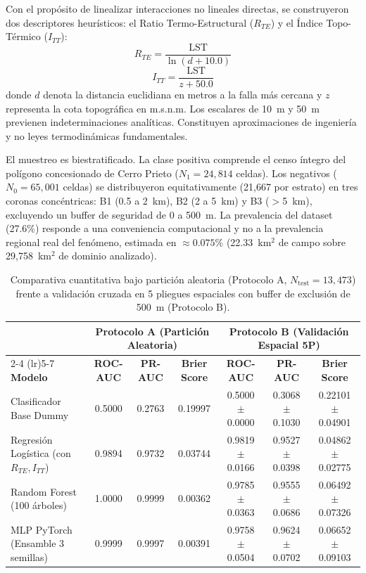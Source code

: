 \documentclass[10pt,twocolumn,a4paper]{article}
\begin{document}
Con el propósito de linealizar interacciones no lineales directas, se construyeron dos descriptores heurísticos: el Ratio Termo-Estructural ($R_{TE}$) y el Índice Topo-Térmico ($I_{TT}$):
\begin{equation}
R_{TE} = \frac{\mathrm{LST}}{\ln(d + 10.0)}
\label{eq_rte}
\end{equation}
\begin{equation}
I_{TT} = \frac{\mathrm{LST}}{z + 50.0}
\label{eq_itt}
\end{equation}
donde $d$ denota la distancia euclidiana en metros a la falla más cercana y $z$ representa la cota topográfica en m.s.n.m. Los escalares de 10~m y 50~m previenen indeterminaciones analíticas. Constituyen aproximaciones de ingeniería y no leyes termodinámicas fundamentales.

El muestreo es biestratificado. La clase positiva comprende el censo íntegro del polígono concesionado de Cerro Prieto ($N_1 = 24,814$ celdas). Los negativos ($N_0 = 65,001$ celdas) se distribuyeron equitativamente (21,667 por estrato) en tres coronas concéntricas: B1 (0.5 a 2~km), B2 (2 a 5~km) y B3 ($>$5~km), excluyendo un buffer de seguridad de 0 a 500~m. La prevalencia del dataset (27.6\%) responde a una conveniencia computacional y no a la prevalencia regional real del fenómeno, estimada en $\approx 0.075\%$ (22.33~km$^2$ de campo sobre 29,758~km$^2$ de dominio analizado).

\begin{table}[t]
\centering
\caption{Comparativa cuantitativa bajo partición aleatoria (Protocolo A, $N_{\text{test}} = 13,473$) frente a validación cruzada en 5 pliegues espaciales con buffer de exclusión de 500~m (Protocolo B).}
\label{tab1}
\footnotesize
\setlength{\tabcolsep}{4.2pt}
\begin{tabular}{lcccccc}
\toprule
 & \multicolumn{3}{c}{\textbf{Protocolo A (Partición Aleatoria)}} & \multicolumn{3}{c}{\textbf{Protocolo B (Validación Espacial 5P)}} \\
\cmidrule(lr){2-4} \cmidrule(lr){5-7}
\textbf{Modelo} & \textbf{ROC-AUC} & \textbf{PR-AUC} & \textbf{Brier Score} & \textbf{ROC-AUC} & \textbf{PR-AUC} & \textbf{Brier Score} \\
\midrule
Clasificador Base Dummy & 0.5000 & 0.2763 & 0.19997 & 0.5000 $\pm$ 0.0000 & 0.3068 $\pm$ 0.1030 & 0.22101 $\pm$ 0.04901 \\
Regresión Logística (con $R_{TE}, I_{TT}$) & 0.9894 & 0.9732 & 0.03744 & 0.9819 $\pm$ 0.0166 & 0.9527 $\pm$ 0.0398 & 0.04862 $\pm$ 0.02775 \\
Random Forest (100 árboles) & 1.0000 & 0.9999 & 0.00362 & 0.9785 $\pm$ 0.0363 & 0.9555 $\pm$ 0.0686 & 0.06492 $\pm$ 0.07326 \\
MLP PyTorch (Ensamble 3 semillas) & 0.9999 & 0.9997 & 0.00391 & 0.9758 $\pm$ 0.0504 & 0.9624 $\pm$ 0.0702 & 0.06652 $\pm$ 0.09103 \\
\bottomrule
\end{tabular}
\end{table}
\end{document}

